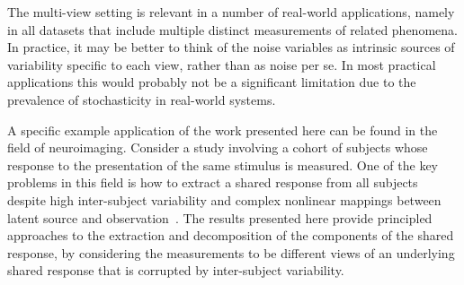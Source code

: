 %




The multi-view setting is relevant in a number of real-world applications, namely in all datasets that include multiple distinct measurements of related phenomena.
In practice, it may be better to think of the noise variables as intrinsic sources of variability specific to each view, rather than as noise per se.
In most practical applications this would probably not be a significant limitation due to the prevalence of stochasticity in real-world systems.

A specific example application of the work presented here can be found in the field of neuroimaging.
Consider a study involving a cohort of subjects whose response to the presentation of the same stimulus is measured.
One of the key problems in this field is how to extract a shared response from all subjects despite high inter-subject variability and complex nonlinear mappings between latent source and observation~\citep{haxby2011common, chen2015reduced}.
The results presented here provide principled approaches to the extraction and decomposition of the components of the shared response, by considering the measurements to be different views of an underlying shared response that is corrupted by inter-subject variability.



